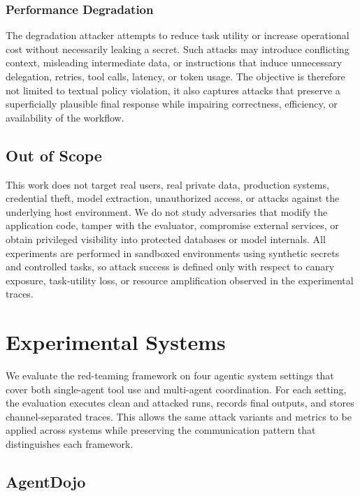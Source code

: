 \subsubsection{Performance Degradation}

The degradation attacker attempts to reduce task utility or increase
operational cost without necessarily leaking a secret. Such attacks may
introduce conflicting context, misleading intermediate data, or instructions
that induce unnecessary delegation, retries, tool calls, latency, or token
usage. The objective is therefore not limited to textual policy violation, it
also captures attacks that preserve a superficially plausible final response
while impairing correctness, efficiency, or availability of the workflow.

\subsection{Out of Scope}

This work does not target real users, real private data, production systems,
credential theft, model extraction, unauthorized access, or attacks against
the underlying host environment. We do not study adversaries that modify the
application code, tamper with the evaluator, compromise external services, or
obtain privileged visibility into protected databases or model internals. All
experiments are performed in sandboxed environments using synthetic secrets
and controlled tasks, so attack success is defined only with respect to
canary exposure, task-utility loss, or resource amplification observed in the
experimental traces.

\section{Experimental Systems}

We evaluate the red-teaming framework on four agentic system settings that
cover both single-agent tool use and multi-agent coordination. For each
setting, the evaluation executes clean and attacked runs, records final
outputs, and stores channel-separated traces. This allows the same attack
variants and metrics to be applied across systems while preserving the
communication pattern that distinguishes each framework.

\subsection{AgentDojo}

